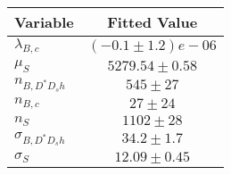 \begin{tabular}[t]{lc}
\hline
Variable &Fitted Value\\
\hline\hline
$\lambda_{B,c}$&$(-0.1\pm1.2)e-06$\\
\hline
$\mu_S$&$5279.54\pm0.58$\\
\hline
$n_{B, D^* D_s h}$&$545\pm27$\\
\hline
$n_{B,c}$&$27\pm24$\\
\hline
$n_S$&$1102\pm28$\\
\hline
$\sigma_{B, D^* D_s h}$&$34.2\pm1.7$\\
\hline
$\sigma_S$&$12.09\pm0.45$\\
\hline
\end{tabular}